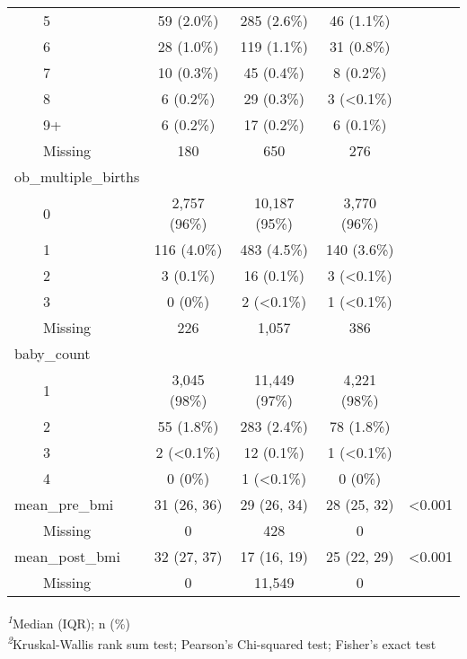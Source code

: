 \begin{longtable}{lcccc}
    5 & 59 (2.0\%) & 285 (2.6\%) & 46 (1.1\%) &  \\ 
    6 & 28 (1.0\%) & 119 (1.1\%) & 31 (0.8\%) &  \\ 
    7 & 10 (0.3\%) & 45 (0.4\%) & 8 (0.2\%) &  \\ 
    8 & 6 (0.2\%) & 29 (0.3\%) & 3 (<0.1\%) &  \\ 
    9+ & 6 (0.2\%) & 17 (0.2\%) & 6 (0.1\%) &  \\ 
    Missing & 180 & 650 & 276 &  \\ 
ob\_multiple\_births &  &  &  &  \\ 
    0 & 2,757 (96\%) & 10,187 (95\%) & 3,770 (96\%) &  \\ 
    1 & 116 (4.0\%) & 483 (4.5\%) & 140 (3.6\%) &  \\ 
    2 & 3 (0.1\%) & 16 (0.1\%) & 3 (<0.1\%) &  \\ 
    3 & 0 (0\%) & 2 (<0.1\%) & 1 (<0.1\%) &  \\ 
    Missing & 226 & 1,057 & 386 &  \\ 
baby\_count &  &  &  &  \\ 
    1 & 3,045 (98\%) & 11,449 (97\%) & 4,221 (98\%) &  \\ 
    2 & 55 (1.8\%) & 283 (2.4\%) & 78 (1.8\%) &  \\ 
    3 & 2 (<0.1\%) & 12 (0.1\%) & 1 (<0.1\%) &  \\ 
    4 & 0 (0\%) & 1 (<0.1\%) & 0 (0\%) &  \\ 
mean\_pre\_bmi & 31 (26, 36) & 29 (26, 34) & 28 (25, 32) & <0.001 \\ 
    Missing & 0 & 428 & 0 &  \\ 
mean\_post\_bmi & 32 (27, 37) & 17 (16, 19) & 25 (22, 29) & <0.001 \\ 
    Missing & 0 & 11,549 & 0 &  \\ 
\bottomrule
\end{longtable}
\begin{minipage}{\linewidth}
\textsuperscript{\textit{1}}Median (IQR); n (\%)\\
\textsuperscript{\textit{2}}Kruskal-Wallis rank sum test; Pearson's Chi-squared test; Fisher's exact test\\
\end{minipage}

